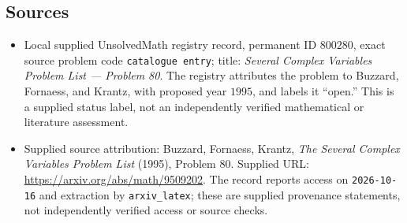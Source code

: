 \documentclass[11pt]{article}
\begin{document}
\subsection{Sources}
\begin{itemize}
\item Local supplied UnsolvedMath registry record, permanent ID \(800280\), exact source problem code \texttt{catalogue entry}; title: \emph{Several Complex Variables Problem List --- Problem 80}. The registry attributes the problem to Buzzard, Fornaess, and Krantz, with proposed year \(1995\), and labels it ``open.'' This is a supplied status label, not an independently verified mathematical or literature assessment.
\item Supplied source attribution: Buzzard, Fornaess, Krantz, \emph{The Several Complex Variables Problem List} (1995), Problem 80. Supplied URL: \url{https://arxiv.org/abs/math/9509202}. The record reports access on \texttt{2026-10-16} and extraction by \texttt{arxiv\_latex}; these are supplied provenance statements, not independently verified access or source checks.
\end{itemize}
\end{document}
